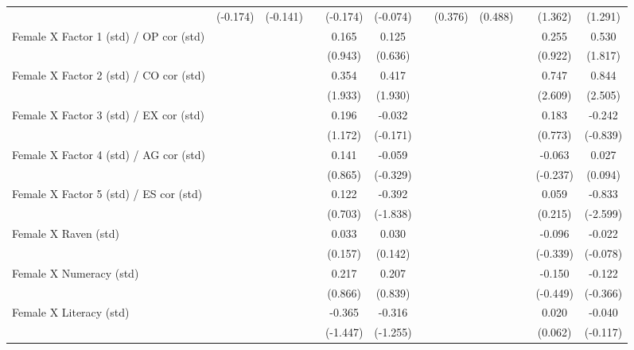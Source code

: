{\begin{longtable}{@{\extracolsep{\fill}}lccccccccccc}
          & (-0.174) & (-0.141) &       & (-0.174) & (-0.074) &       & (0.376) & (0.488) &       & (1.362) & (1.291) \\
    Female X Factor 1 (std) / OP cor (std) &       &       &       & 0.165 & 0.125 &       &       &       &       & 0.255 & 0.530 \\
          &       &       &       & (0.943) & (0.636) &       &       &       &       & (0.922) & (1.817) \\
    Female X Factor 2 (std) / CO cor (std) &       &       &       & 0.354 & 0.417 &       &       &       &       & 0.747 & 0.844 \\
          &       &       &       & (1.933) & (1.930) &       &       &       &       & (2.609) & (2.505) \\
    Female X Factor 3 (std) / EX cor (std) &       &       &       & 0.196 & -0.032 &       &       &       &       & 0.183 & -0.242 \\
          &       &       &       & (1.172) & (-0.171) &       &       &       &       & (0.773) & (-0.839) \\
    Female X Factor 4 (std) / AG cor (std) &       &       &       & 0.141 & -0.059 &       &       &       &       & -0.063 & 0.027 \\
          &       &       &       & (0.865) & (-0.329) &       &       &       &       & (-0.237) & (0.094) \\
    Female X Factor 5 (std) / ES cor (std) &       &       &       & 0.122 & -0.392 &       &       &       &       & 0.059 & -0.833 \\
          &       &       &       & (0.703) & (-1.838) &       &       &       &       & (0.215) & (-2.599) \\
    Female X Raven (std) &       &       &       & 0.033 & 0.030 &       &       &       &       & -0.096 & -0.022 \\
          &       &       &       & (0.157) & (0.142) &       &       &       &       & (-0.339) & (-0.078) \\
    Female X Numeracy (std) &       &       &       & 0.217 & 0.207 &       &       &       &       & -0.150 & -0.122 \\
          &       &       &       & (0.866) & (0.839) &       &       &       &       & (-0.449) & (-0.366) \\
    Female X Literacy (std) &       &       &       & -0.365 & -0.316 &       &       &       &       & 0.020 & -0.040 \\
          &       &       &       & (-1.447) & (-1.255) &       &       &       &       & (0.062) & (-0.117) \\

\end{longtable}}
